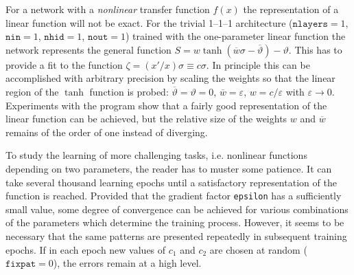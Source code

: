 For a network with a \emph{nonlinear} transfer function $f(x)$ the representation of a linear function will not be exact. For the trivial 1--1--1 architecture ($\texttt{nlayers}=1$, $\texttt{nin}=1$, $\texttt{nhid}=1$, $\texttt{nout}=1$) trained with the one-parameter linear function the network represents the general function $S=w\tanh{(\overline{w}\sigma-\overline{\vartheta})}-\vartheta$. This has to provide a fit to the function $\zeta=(x'/x)\sigma\equiv c\sigma$. In principle this can be accomplished with arbitrary precision by scaling the weights so that the linear region of the $\tanh$ function is probed: $\overline{\vartheta}=\vartheta=0$, $\overline{w}=\varepsilon$, $w=c/\varepsilon$ with $\varepsilon\rightarrow0$. Experiments with the program show that a fairly good representation of the linear function can be achieved, but the relative size of the weights $w$ and $\overline{w}$ remains of the order of one instead of diverging.

To study the learning of more challenging tasks, i.e. nonlinear functions depending on two parameters, the reader has to muster some patience. It can take several thousand learning epochs until a satisfactory representation of the function is reached. Provided that the gradient factor \texttt{epsilon} has a sufficiently small value, some degree of convergence can be achieved for various combinations of the parameters which determine the training process. However, it seems to be necessary that the same patterns are presented repeatedly in subsequent training epochs. If in each epoch new values of $c_1$ and $c_2$ are chosen at random ($\texttt{fixpat}=0$), the errors remain at a high level.

